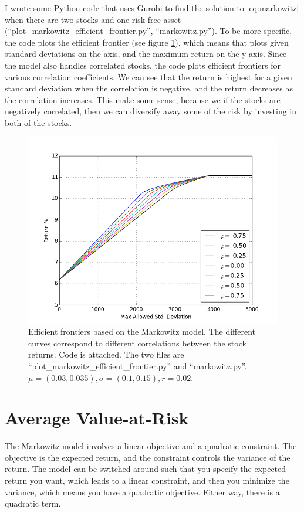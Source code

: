 \documentclass{amsart}
\theoremstyle{definition}
\theoremstyle{remark}
\begin{document}
I wrote some Python code that uses Gurobi to find the solution to \ref{eq:markowitz} when there are two stocks and one risk-free asset (``plot\_markowitz\_efficient\_frontier.py'', ``markowitz.py''). To be more specific, the code plots the efficient frontier (see figure \ref{fig:markowitz}), which means that plots given standard deviations on the axis, and the maximum return on the y-axis. Since the model also handles correlated stocks, the code plots efficient frontiers for various correlation coefficients. We can see that the return is highest for a given standard deviation when the correlation is negative, and the return decreases as the correlation increases. This make some sense, because we if the stocks are negatively correlated, then we can diversify away some of the risk by investing in both of the stocks.
\begin{figure}
\centering
\includegraphics[scale=0.5]{markowitz.png}
\caption{Efficient frontiers based on the Markowitz model. The different curves correspond to different correlations between the stock returns.  Code is attached. The two files are ``plot\_markowitz\_efficient\_frontier.py'' and ``markowitz.py''. $\mu = (0.03, 0.035), \sigma=(0.1, 0.15), r = 0.02$.}
\label{fig:markowitz}
\end{figure}

\section{Average Value-at-Risk}
The Markowitz model involves a linear objective and a quadratic constraint. The objective is the expected return, and the constraint controls the variance of the return. The model can be switched around such that you specify the expected return you want, which leads to a linear constraint, and then you minimize the variance, which means you have a quadratic objective. Either way, there is a quadratic term.
\end{document}
